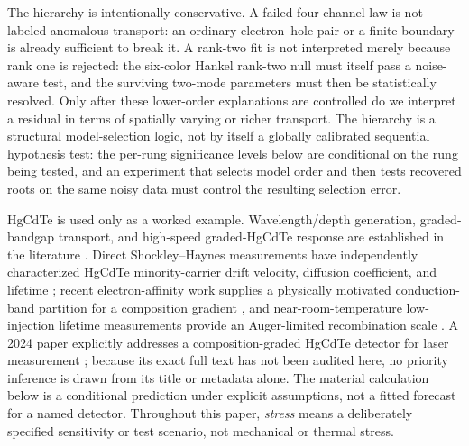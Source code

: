\documentclass[11pt]{article}
\begin{document}
The hierarchy is intentionally conservative. A failed four-channel law is not labeled anomalous transport: an ordinary electron--hole pair or a finite boundary is already sufficient to break it. A rank-two fit is not interpreted merely because rank one is rejected: the six-color Hankel rank-two null must itself pass a noise-aware test, and the surviving two-mode parameters must then be statistically resolved. Only after these lower-order explanations are controlled do we interpret a residual in terms of spatially varying or richer transport. The hierarchy is a structural model-selection logic, not by itself a globally calibrated sequential hypothesis test: the per-rung significance levels below are conditional on the rung being tested, and an experiment that selects model order and then tests recovered roots on the same noisy data must control the resulting selection error.

HgCdTe is used only as a worked example. Wavelength/depth generation, graded-bandgap transport, and high-speed graded-HgCdTe response are established in the literature \cite{Sang2022}. Direct Shockley--Haynes measurements have independently characterized HgCdTe minority-carrier drift velocity, diffusion coefficient, and lifetime \cite{Rothman2010}; recent electron-affinity work supplies a physically motivated conduction-band partition for a composition gradient \cite{RhigerMustafa2025}, and near-room-temperature low-injection lifetime measurements provide an Auger-limited recombination scale \cite{Kopytko2021}. A 2024 paper explicitly addresses a composition-graded HgCdTe detector for laser measurement \cite{Xu2024Laser}; because its exact full text has not been audited here, no priority inference is drawn from its title or metadata alone. The material calculation below is a conditional prediction under explicit assumptions, not a fitted forecast for a named detector. Throughout this paper, \emph{stress} means a deliberately specified sensitivity or test scenario, not mechanical or thermal stress.
\end{document}
